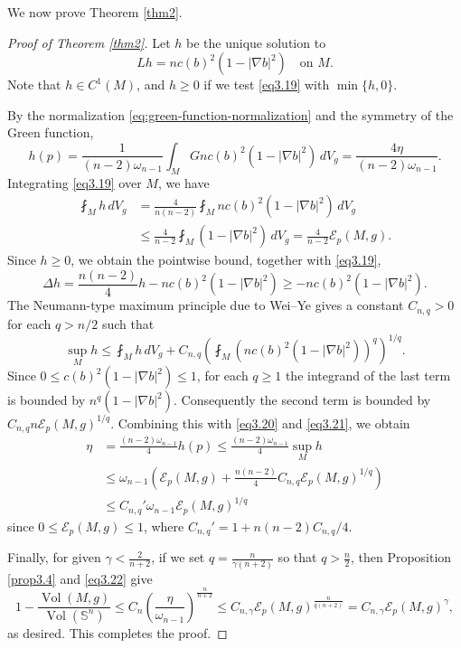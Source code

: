 \documentclass[11pt]{amsart}
\theoremstyle{plain}
\numberwithin{equation}{section}
\renewcommand{\S}{\mathbb{S}}
\newcommand{\E}{\mathcal{E}}
\DeclareMathOperator{\vol}{Vol}
\newcommand{\dvol}{\,dV_g}
\begin{document}
We now prove Theorem \ref{thm2}.

\begin{proof}[Proof of Theorem \ref{thm2}]
Let $h$ be the unique solution to
\begin{equation}\label{eq3.19}
Lh=nc(b)^2(1-|\nabla b|^2)\quad\text{on $M$}.
\end{equation}
Note that $h\in C^1(M)$, and $h\ge0$ if we test \eqref{eq3.19} with $\min\{h,0\}$.

By the normalization \eqref{eq:green-function-normalization} and the symmetry of the Green function,
\begin{equation}\label{eq3.20}
h(p)=\frac{1}{(n-2)\omega_{n-1}}\int_M Gnc(b)^2(1-|\nabla b|^2)\dvol=\frac{4\eta}{(n-2)\omega_{n-1}}.
\end{equation}
Integrating \eqref{eq3.19} over $M$, we have
\begin{equation}\label{eq3.21}
\begin{aligned}
\fint_Mh\dvol&=\frac{4}{n(n-2)}\fint_M nc(b)^2(1-|\nabla b|^2)\dvol\\
&\le\frac{4}{n-2}\fint_M (1-|\nabla b|^2)\dvol=\frac{4}{n-2}\E_p(M,g).
\end{aligned}
\end{equation}
Since $h\ge0 $, we obtain the pointwise bound, together with \eqref{eq3.19},
\begin{equation*}
\Delta h=\frac{n(n-2)}{4}h-nc(b)^2(1-|\nabla b|^2)\ge -nc(b)^2(1-|\nabla b|^2).
\end{equation*}
The Neumann-type maximum principle due to Wei--Ye \cite[Theorem C]{WeiYe2007} gives a constant $C_{n,q}>0$ for each $q>n/2$ such that
\begin{equation*}
\sup_Mh\le\fint_Mh\dvol+C_{n,q}\left(\fint_M\left(nc(b)^2(1-|\nabla b|^2)\right)^q\right)^{1/q}.
\end{equation*}
Since $0\le c(b)^2(1-|\nabla b|^2)\le 1$, for each $q\ge 1$ the integrand of the last term is bounded by $n^q(1-|\nabla b|^2)$. Consequently the second term is bounded by $C_{n,q}n\E_p(M,g)^{1/q}$. Combining this with \eqref{eq3.20} and \eqref{eq3.21}, we obtain
\begin{equation}\label{eq3.22}
\begin{aligned}
\eta&=\frac{(n-2)\omega_{n-1}}{4}h(p)\le\frac{(n-2)\omega_{n-1}}{4}\sup_M h\\
&\le \omega_{n-1}\left(\E_p(M,g)+\frac{n(n-2)}{4}C_{n,q}\E_p(M,g)^{1/q}\right)\\
&\le C_{n,q}'\omega_{n-1}\E_p(M,g)^{1/q}
\end{aligned}
\end{equation}
since $0\le\E_p(M,g)\le 1$, where $C_{n,q}'=1+n(n-2)C_{n,q}/4$.

Finally, for given $\gamma<\frac{2}{n+2}$, if we set $q=\frac{n}{\gamma(n+2)}$ so that $q>\frac{n}{2}$, then Proposition \ref{prop3.4} and \eqref{eq3.22} give
\begin{equation*}
1-\frac{\vol(M,g)}{\vol(\S^n)}\le C_n\left(\frac{\eta}{\omega_{n-1}}\right)^{\frac{n}{n+2}}\le C_{n,\gamma}\E_p(M,g)^{\frac{n}{q(n+2)}}=C_{n,\gamma}\E_p(M,g)^{\gamma},
\end{equation*}
as desired. This completes the proof.
\end{proof}
\end{document}
